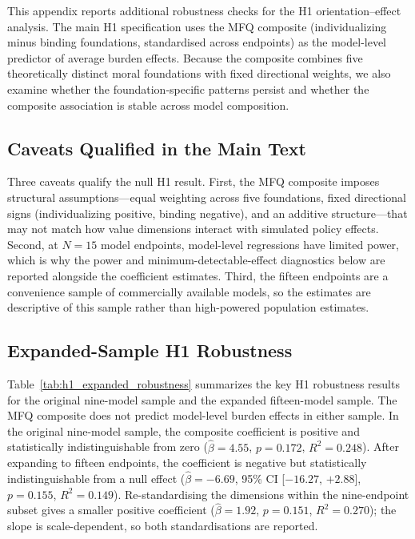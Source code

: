 This appendix reports additional robustness checks for the H1 orientation--effect analysis. The main H1 specification uses the MFQ composite (individualizing minus binding foundations, standardised across endpoints) as the model-level predictor of average burden effects. Because the composite combines five theoretically distinct moral foundations with fixed directional weights, we also examine whether the foundation-specific patterns persist and whether the composite association is stable across model composition.

\subsection{Caveats Qualified in the Main Text}

Three caveats qualify the null H1 result. First, the MFQ composite imposes structural assumptions---equal weighting across five foundations, fixed directional signs (individualizing positive, binding negative), and an additive structure---that may not match how value dimensions interact with simulated policy effects. Second, at $N = 15$ model endpoints, model-level regressions have limited power, which is why the power and minimum-detectable-effect diagnostics below are reported alongside the coefficient estimates. Third, the fifteen endpoints are a convenience sample of commercially available models, so the estimates are descriptive of this sample rather than high-powered population estimates.

\subsection{Expanded-Sample H1 Robustness}

Table~\ref{tab:h1_expanded_robustness} summarizes the key H1 robustness results for the original nine-model sample and the expanded fifteen-model sample. The MFQ composite does not predict model-level burden effects in either sample. In the original nine-model sample, the composite coefficient is positive and statistically indistinguishable from zero ($\hat{\beta}=4.55$, $p=0.172$, $R^2=0.248$). After expanding to fifteen endpoints, the coefficient is negative but statistically indistinguishable from a null effect ($\hat{\beta}=-6.69$, 95\% CI [$-16.27$, $+2.88$], $p=0.155$, $R^2=0.149$). Re-standardising the dimensions within the nine-endpoint subset gives a smaller positive coefficient ($\hat{\beta}=1.92$, $p=0.151$, $R^2=0.270$); the slope is scale-dependent, so both standardisations are reported.

